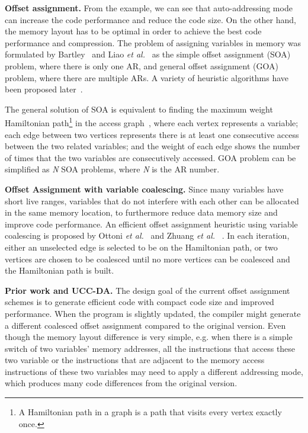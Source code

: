 \textbf{Offset assignment.}
From the example, we can see that auto-addressing mode can increase the code performance and reduce the code size. On the other hand, the memory layout has to be optimal in order to achieve the best code performance and compression. The problem of assigning variables in memory was formulated by Bartley~\cite{related:bartley} and Liao \textit{et al.}~\cite{related:liao} as the simple offset assignment (SOA) problem, where there is only one AR, and general offset assignment (GOA) problem, where there are multiple ARs. A variety of heuristic algorithms have been proposed later~\cite{related:atri,related:choi,related:leupers-1996,related:leupers-1998,related:ottoni,related:rao,related:sudarsanam,related:zhuang}.

The general solution of SOA is equivalent to finding the maximum weight Hamiltonian path\footnote{A Hamiltonian path in a graph is a path that visits every vertex exactly once.} in the access graph~\cite{related:bartley, related:liao}, where each vertex represents a variable; each edge between two vertices represents there is at least one consecutive access between the two related variables; and the weight of each edge shows the number of times that the two variables are consecutively accessed. GOA problem can be simplified as \textit{N} SOA problems, where \textit{N} is the AR number. 

\textbf{Offset Assignment with variable coalescing.}
Since many variables have short live ranges, variables that do not interfere with each other can be allocated in the same memory location, to furthermore reduce data memory size and improve code performance. An efficient offset assignment heuristic using variable coalescing is proposed by Ottoni \textit{et al.}~\cite{related:ottoni} and Zhuang \textit{et al.} ~\cite{related:zhuang}. In each iteration, either an unselected edge is selected to be on the Hamiltonian path, or two vertices are chosen to be coalesced until no more vertices can be coalesced and the Hamiltonian path is built.

\textbf{Prior work and UCC-DA.}
The design goal of the current offset assignment schemes is to generate efficient code with compact code size and improved performance.  When the program is slightly updated, the compiler might generate a different coalesced offset assignment compared to the original version. Even though the memory layout difference is very simple, e.g. when there is a simple switch of two variables' memory addresses, all the instructions that access these two variable or the instructions that are adjacent to the memory access instructions of these two variables may need to apply a different addressing mode, which produces many code differences from the original version. 


